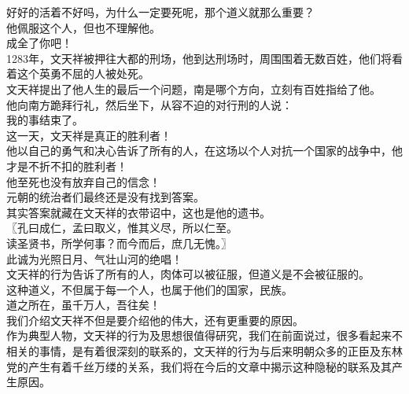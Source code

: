 \begin{multicols}{\theparacolNo}
好好的活着不好吗，为什么一定要死呢，那个道义就那么重要？\\

他佩服这个人，但也不理解他。\\

成全了你吧！\\

1283年，文天祥被押往大都的刑场，他到达刑场时，周围围着无数百姓，他们将看着这个英勇不屈的人被处死。\\

文天祥提出了他人生的最后一个问题，南是哪个方向，立刻有百姓指给了他。\\

他向南方跪拜行礼，然后坐下，从容不迫的对行刑的人说：\\

我的事结束了。\\

这一天，文天祥是真正的胜利者！\\

他以自己的勇气和决心告诉了所有的人，在这场以个人对抗一个国家的战争中，他才是不折不扣的胜利者！\\

他至死也没有放弃自己的信念！\\

元朝的统治者们最终还是没有找到答案。\\

其实答案就藏在文天祥的衣带诏中，这也是他的遗书。\\

〖孔曰成仁，孟曰取义，惟其义尽，所以仁至。\\

读圣贤书，所学何事？而今而后，庶几无愧。〗\\

此诚为光照日月、气壮山河的绝唱！\\

文天祥的行为告诉了所有的人，肉体可以被征服，但道义是不会被征服的。\\

这种道义，不但属于每一个人，也属于他们的国家，民族。\\

道之所在，虽千万人，吾往矣！\\

我们介绍文天祥不但是要介绍他的伟大，还有更重要的原因。\\

作为典型人物，文天祥的行为及思想很值得研究，我们在前面说过，很多看起来不相关的事情，是有着很深刻的联系的，文天祥的行为与后来明朝众多的正臣及东林党的产生有着千丝万缕的关系，我们将在今后的文章中揭示这种隐秘的联系及其产生原因。\\


\end{multicols}
